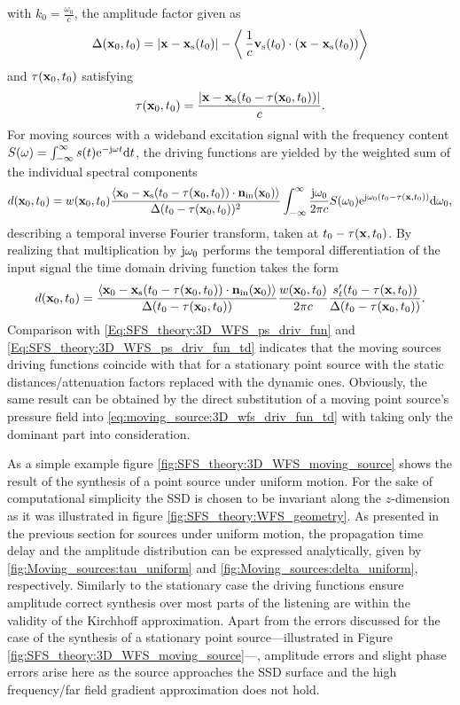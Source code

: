 with $k_0 = \frac{\omega_0}{c}$, the amplitude factor given as
\begin{equation}
\Delta( \mathbf{x}_0,t_0 ) = |\mathbf{x} - \mathbf{x}_{\mathrm{s}}(t_0)| - \left<\, \frac{1}{c}\mathbf{v}_{\mathrm{s}}(t_0) \cdot (\mathbf{x} - \mathbf{x}_{\mathrm{s}}(t_0)) \right> 
\end{equation}
and $\tau(\mathbf{x}_0,t_0)$ satisfying
\begin{equation}
\tau(\mathbf{x}_0,t_0) =  \frac{| \mathbf{x} - \mathbf{x}_{\mathrm{s}}( t_0 - \tau(\mathbf{x}_0,t_0)) |  }{c}.
\end{equation}
For moving sources with a wideband excitation signal with the frequency content $S(\omega) = \int_{-\infty}^{\infty} s(t) \mathrm{e}^{-\mathrm{j} \omega t} \mathrm{d} t$, the driving functions are yielded by the weighted sum of the individual spectral components
\begin{equation}
d(\mathbf{x}_0,t_0) =  w(\mathbf{x}_0,t_0)  
\frac{\left< \mathbf{x}_0 -\mathbf{x}_{\mathrm{s}}(t_0-\tau(\mathbf{x}_0,t_0)) \cdot \mathbf{n}_{\mathrm{in}}(\mathbf{x}_0) \right>}{\Delta(t_0-\tau(\mathbf{x}_0,t_0))^2}
\int_{-\infty}^{\infty} \frac{\mathrm{j} \omega_0}{2\pi c} S(\omega_0 )\mathrm{e}^{\mathrm{j} \omega_0\left( t_0 - \tau( \mathbf{x},t_0 )\right)} \mathrm{d} \omega_0,
\end{equation}
describing a temporal inverse Fourier transform, taken at $t_0 - \tau( \mathbf{x},t_0 )$.
By realizing that multiplication by $\mathrm{j} \omega_0$ performs the temporal differentiation of the input signal the time domain driving function takes the form
\begin{equation}
d(\mathbf{x}_0,t_0) =   
\frac{\left< \mathbf{x}_0 -\mathbf{x}_{\mathrm{s}}(t_0-\tau(\mathbf{x}_0,t_0)) \cdot \mathbf{n}_{\mathrm{in}}(\mathbf{x}_0) \right>}{\Delta(t_0-\tau(\mathbf{x}_0,t_0))}
\frac{w(\mathbf{x}_0,t_0)}{2\pi c} \frac{s'_t( t_0 - \tau( \mathbf{x},t_0 ) )}{\Delta(t_0-\tau(\mathbf{x}_0,t_0))}.
\end{equation}	
Comparison with \eqref{Eq:SFS_theory:3D_WFS_ps_driv_fun} and \eqref{Eq:SFS_theory:3D_WFS_ps_driv_fun_td} indicates that the moving sources driving functions coincide with that for a stationary point source with the static distances/attenuation factors replaced with the dynamic ones.
Obviously, the same result can be obtained by the direct substitution of a moving point source's pressure field into \eqref{eq:moving_source:3D_wfs_driv_fun_td} with taking only the dominant part into consideration.

As a simple example figure \ref{fig:SFS_theory:3D_WFS_moving_source} shows the result of the synthesis of a point source under uniform motion.
For the sake of computational simplicity the SSD is chosen to be invariant along the $z$-dimension as it was illustrated in figure \ref{fig:SFS_theory:WFS_geometry}.
As presented in the previous section for sources under uniform motion, the propagation time delay and the amplitude distribution can be expressed analytically, given by \eqref{fig:Moving_sources:tau_uniform} and \eqref{fig:Moving_sources:delta_uniform}, respectively.
Similarly to the stationary case the driving functions ensure amplitude correct synthesis over most parts of the listening are within the validity of the Kirchhoff approximation.
Apart from the errors discussed for the case of the synthesis of a stationary point source---illustrated in Figure \ref{fig:SFS_theory:3D_WFS_moving_source}---, amplitude errors and slight phase errors arise here as the source approaches the SSD surface and the high frequency/far field gradient approximation does not hold.

